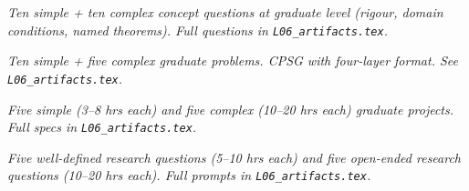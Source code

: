 \begin{tcolorbox}[gradconceptbox, title={SCQG + CCQG · L06 · Tiers 4–5}]
\textit{Ten simple + ten complex concept questions at graduate level (rigour, domain
conditions, named theorems). Full questions in \texttt{L06_artifacts.tex}.}
\end{tcolorbox}

\begin{tcolorbox}[gradprobbox, title={SPSG + CPSG · L06 · Tiers 4–5}]
\textit{Ten simple + five complex graduate problems.
CPSG with four-layer format. See \texttt{L06_artifacts.tex}.}
\end{tcolorbox}

\begin{tcolorbox}[gradprobbox, title={SPJG (×5) + CPJG (×5) · L06 · Tiers 4–5}]
\textit{Five simple (3–8 hrs each) and five complex (10–20 hrs each) graduate projects.
Full specs in \texttt{L06_artifacts.tex}.}
\end{tcolorbox}

\begin{tcolorbox}[researchbox, title={WRQ (×5) + ORQ (×5) · L06 · Tiers 4–5}]
\textit{Five well-defined research questions (5–10 hrs each) and five open-ended
research questions (10–20 hrs each). Full prompts in \texttt{L06_artifacts.tex}.}
\end{tcolorbox}
